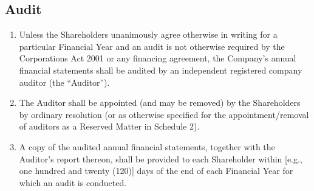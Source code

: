 \subsection{Audit} \label{subsec:Audit}
\begin{enumerate}[label=(\alph*)]
\item Unless the Shareholders unanimously agree otherwise in writing for a particular Financial Year and an audit is not otherwise required by the Corporations Act 2001 or any financing agreement, the Company's annual financial statements shall be audited by an independent registered company auditor (the ``Auditor'').
\item The Auditor shall be appointed (and may be removed) by the Shareholders by ordinary resolution (or as otherwise specified for the appointment/removal of auditors as a Reserved Matter in Schedule 2).
\item A copy of the audited annual financial statements, together with the Auditor's report thereon, shall be provided to each Shareholder within [e.g., one hundred and twenty (120)] days of the end of each Financial Year for which an audit is conducted.
\end{enumerate}

